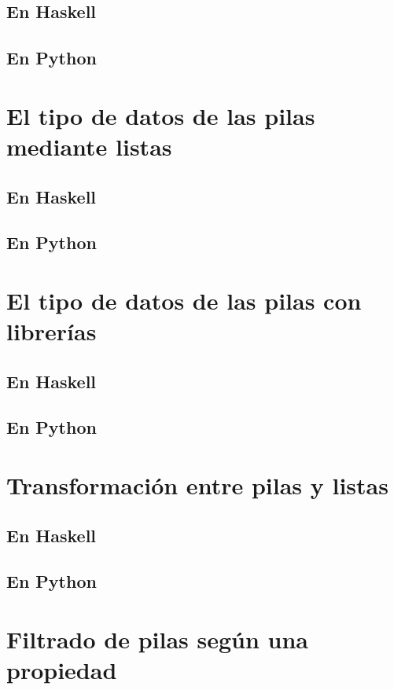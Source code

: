 \documentclass[a4paper,12pt,twoside]{book}
\begin{document}
\subsection{En Haskell}
\subsection{En Python}

\section{El tipo de datos de las pilas mediante listas}
\subsection{En Haskell}
\subsection{En Python}

\section{El tipo de datos de las pilas con librerías}
\subsection{En Haskell}
\subsection{En Python}

\section{Transformación entre pilas y listas}
\subsection{En Haskell}
\subsection{En Python}

\section{Filtrado de pilas según una propiedad}
\end{document}
